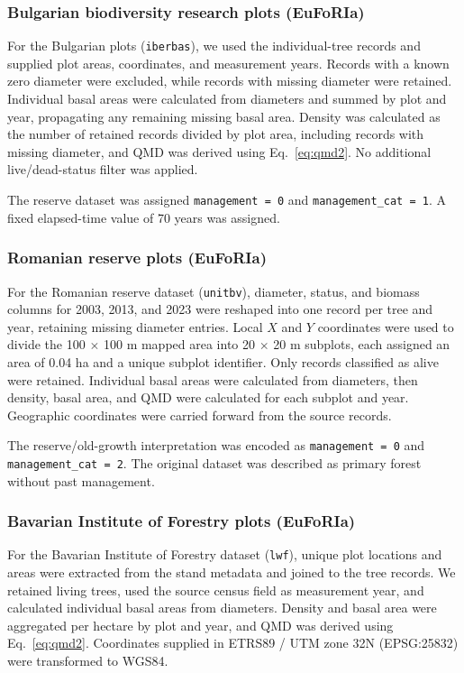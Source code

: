\documentclass{myreport}
\begin{document}
% 

\subsubsection{Bulgarian biodiversity research plots (EuFoRIa)}
For the Bulgarian plots (\texttt{iberbas}), we used the individual-tree records and supplied plot areas, coordinates, and measurement years. Records with a known zero diameter were excluded, while records with missing diameter were retained. Individual basal areas were calculated from diameters and summed by plot and year, propagating any remaining missing basal area. Density was calculated as the number of retained records divided by plot area, including records with missing diameter, and QMD was derived using Eq.~\ref{eq:qmd2}. No additional live/dead-status filter was applied.

The reserve dataset was assigned \texttt{management = 0} and \texttt{management\_cat = 1}. A fixed elapsed-time value of 70 years was assigned.

% 

\subsubsection{Romanian reserve plots (EuFoRIa)}
For the Romanian reserve dataset (\texttt{unitbv}), diameter, status, and biomass columns for 2003, 2013, and 2023 were reshaped into one record per tree and year, retaining missing diameter entries. Local $X$ and $Y$ coordinates were used to divide the 100 $\times$ 100 m mapped area into 20 $\times$ 20 m subplots, each assigned an area of 0.04 ha and a unique subplot identifier. Only records classified as alive were retained. Individual basal areas were calculated from diameters, then density, basal area, and QMD were calculated for each subplot and year. Geographic coordinates were carried forward from the source records.

The reserve/old-growth interpretation was encoded as \texttt{management = 0} and \texttt{management\_cat = 2}. The original dataset was described as primary forest without past management.

% 

\subsubsection{Bavarian Institute of Forestry plots (EuFoRIa)}
For the Bavarian Institute of Forestry dataset (\texttt{lwf}), unique plot locations and areas were extracted from the stand metadata and joined to the tree records. We retained living trees, used the source census field as measurement year, and calculated individual basal areas from diameters. Density and basal area were aggregated per hectare by plot and year, and QMD was derived using Eq.~\ref{eq:qmd2}. Coordinates supplied in ETRS89 / UTM zone 32N (EPSG:25832) were transformed to WGS84.
\end{document}
